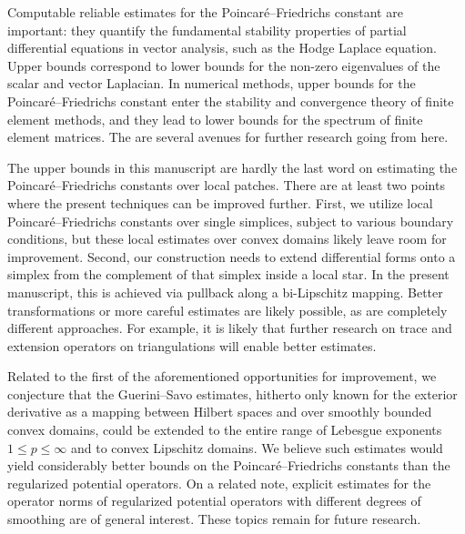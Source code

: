 \documentclass[10pt,letterpaper]{article}
\begin{document}
Computable reliable estimates for the Poincar\'e--Friedrichs constant are important: 
they quantify the fundamental stability properties of partial differential equations in vector analysis,
such as the Hodge Laplace equation. 
Upper bounds correspond to lower bounds for the non-zero eigenvalues of the scalar and vector Laplacian.
In numerical methods, upper bounds for the Poincar\'e--Friedrichs constant enter the stability and convergence theory of finite element methods,
and they lead to lower bounds for the spectrum of finite element matrices. 
The are several avenues for further research going from here. 


The upper bounds in this manuscript are hardly the last word on estimating the Poincar\'e--Friedrichs constants over local patches. There are at least two points where the present techniques can be improved further. First, we utilize local Poincar\'e--Friedrichs constants over single simplices, subject to various boundary conditions, but these local estimates over convex domains likely leave room for improvement.
Second, our construction needs to extend differential forms onto a simplex from the complement of that simplex inside a local star. In the present manuscript, this is achieved via pullback along a bi-Lipschitz mapping. 
Better transformations or more careful estimates are likely possible, as are completely different approaches.  For example, it is likely that further research on trace and extension operators on triangulations will enable better estimates.

Related to the first of the aforementioned opportunities for improvement, we conjecture that the Guerini--Savo estimates, hitherto only known for the exterior derivative as a mapping between Hilbert spaces and over smoothly bounded convex domains, could be extended to the entire range of Lebesgue exponents $1 \leq p \leq \infty$ and to convex Lipschitz domains. We believe such estimates would yield considerably better bounds on the Poincar\'e--Friedrichs constants than the regularized potential operators. 
On a related note, explicit estimates for the operator norms of regularized potential operators with different degrees of smoothing are of general interest. 
These topics remain for future research. 
\end{document}
